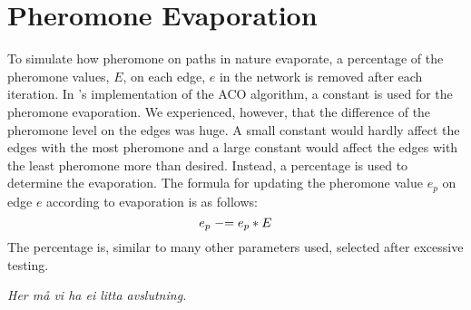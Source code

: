\section{Pheromone Evaporation}

To simulate how pheromone on paths in nature evaporate, a percentage of the pheromone values, $E$, on each edge, $e$ in the network is removed after each iteration. In \citet{nanda11}'s implementation of the ACO algorithm, a constant is used for the pheromone evaporation. We experienced, however, that the difference of the pheromone level on the edges was huge. A small constant would hardly affect the edges with the most pheromone and a large constant would affect the edges with the least pheromone more than desired. Instead, a percentage is used to determine the evaporation.  
The formula for updating the pheromone value $e_p$ on edge $e$ according to evaporation is as follows: 
\newline
$$e_p \mathrel{-}= e_p*E$$
\newline
The percentage is, similar to many other parameters used, selected after excessive testing. 


\emph{\color{blue}Her må vi ha ei litta avslutning.}